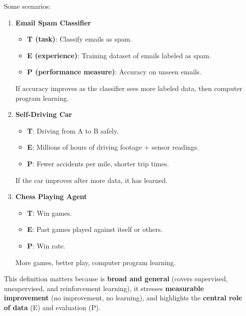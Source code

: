 \begin{examplebox}
    Some scenarios:
    \begin{enumerate}
        \item \textbf{Email Spam Classifier}
        \begin{itemize}
            \item \textbf{T (task)}: Classify emails as spam.
            \item \textbf{E (experience)}: Training dataset of emails labeled as spam.
            \item \textbf{P (performance measure)}: Accuracy on unseen emails.
        \end{itemize}
        If accuracy improves as the classifier sees more labeled data, then computer program learning.
        \item \textbf{Self-Driving Car}
        \begin{itemize}
            \item \textbf{T}: Driving from A to B safely.
            \item \textbf{E}: Millions of hours of driving footage $+$ sensor readings.
            \item \textbf{P}: Fewer accidents per mile, shorter trip times.
        \end{itemize}
        If the car improves after more data, it has learned.
        \item \textbf{Chess Playing Agent}
        \begin{itemize}
            \item \textbf{T}: Win games.
            \item \textbf{E}: Past games played against itself or others.
            \item \textbf{P}: Win rate.
        \end{itemize}
        More games, better play, computer program learning.
    \end{enumerate}
\end{examplebox}

\noindent
This definition matters because is \textbf{broad and general} (covers supervised, unsupervised, and reinforcement learning), it stresses \textbf{measurable improvement} (no improvement, no learning), and highlights the \textbf{central role of data} (E) and evaluation (P).

